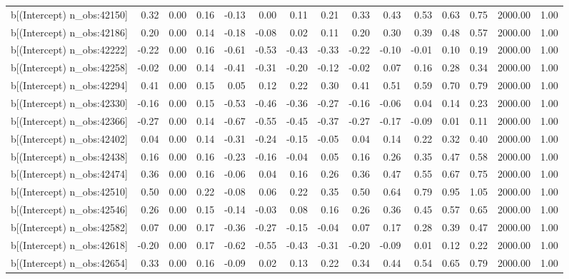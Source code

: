 \begin{table}[ht]
\begin{tabular}{rrrrrrrrrrrrrrr}
  b[(Intercept) n\_obs:42150] & 0.32 & 0.00 & 0.16 & -0.13 & 0.00 & 0.11 & 0.21 & 0.33 & 0.43 & 0.53 & 0.63 & 0.75 & 2000.00 & 1.00 \\ 
  b[(Intercept) n\_obs:42186] & 0.20 & 0.00 & 0.14 & -0.18 & -0.08 & 0.02 & 0.11 & 0.20 & 0.30 & 0.39 & 0.48 & 0.57 & 2000.00 & 1.00 \\ 
  b[(Intercept) n\_obs:42222] & -0.22 & 0.00 & 0.16 & -0.61 & -0.53 & -0.43 & -0.33 & -0.22 & -0.10 & -0.01 & 0.10 & 0.19 & 2000.00 & 1.00 \\ 
  b[(Intercept) n\_obs:42258] & -0.02 & 0.00 & 0.14 & -0.41 & -0.31 & -0.20 & -0.12 & -0.02 & 0.07 & 0.16 & 0.28 & 0.34 & 2000.00 & 1.00 \\ 
  b[(Intercept) n\_obs:42294] & 0.41 & 0.00 & 0.15 & 0.05 & 0.12 & 0.22 & 0.30 & 0.41 & 0.51 & 0.59 & 0.70 & 0.79 & 2000.00 & 1.00 \\ 
  b[(Intercept) n\_obs:42330] & -0.16 & 0.00 & 0.15 & -0.53 & -0.46 & -0.36 & -0.27 & -0.16 & -0.06 & 0.04 & 0.14 & 0.23 & 2000.00 & 1.00 \\ 
  b[(Intercept) n\_obs:42366] & -0.27 & 0.00 & 0.14 & -0.67 & -0.55 & -0.45 & -0.37 & -0.27 & -0.17 & -0.09 & 0.01 & 0.11 & 2000.00 & 1.00 \\ 
  b[(Intercept) n\_obs:42402] & 0.04 & 0.00 & 0.14 & -0.31 & -0.24 & -0.15 & -0.05 & 0.04 & 0.14 & 0.22 & 0.32 & 0.40 & 2000.00 & 1.00 \\ 
  b[(Intercept) n\_obs:42438] & 0.16 & 0.00 & 0.16 & -0.23 & -0.16 & -0.04 & 0.05 & 0.16 & 0.26 & 0.35 & 0.47 & 0.58 & 2000.00 & 1.00 \\ 
  b[(Intercept) n\_obs:42474] & 0.36 & 0.00 & 0.16 & -0.06 & 0.04 & 0.16 & 0.26 & 0.36 & 0.47 & 0.55 & 0.67 & 0.75 & 2000.00 & 1.00 \\ 
  b[(Intercept) n\_obs:42510] & 0.50 & 0.00 & 0.22 & -0.08 & 0.06 & 0.22 & 0.35 & 0.50 & 0.64 & 0.79 & 0.95 & 1.05 & 2000.00 & 1.00 \\ 
  b[(Intercept) n\_obs:42546] & 0.26 & 0.00 & 0.15 & -0.14 & -0.03 & 0.08 & 0.16 & 0.26 & 0.36 & 0.45 & 0.57 & 0.65 & 2000.00 & 1.00 \\ 
  b[(Intercept) n\_obs:42582] & 0.07 & 0.00 & 0.17 & -0.36 & -0.27 & -0.15 & -0.04 & 0.07 & 0.17 & 0.28 & 0.39 & 0.47 & 2000.00 & 1.00 \\ 
  b[(Intercept) n\_obs:42618] & -0.20 & 0.00 & 0.17 & -0.62 & -0.55 & -0.43 & -0.31 & -0.20 & -0.09 & 0.01 & 0.12 & 0.22 & 2000.00 & 1.00 \\ 
  b[(Intercept) n\_obs:42654] & 0.33 & 0.00 & 0.16 & -0.09 & 0.02 & 0.13 & 0.22 & 0.34 & 0.44 & 0.54 & 0.65 & 0.79 & 2000.00 & 1.00 \\ 

\end{tabular}
\end{table}
